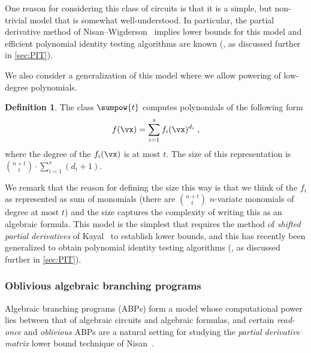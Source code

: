 \documentclass[11pt]{article}
\numberwithin{equation}{section}
\theoremstyle{definition}
\newtheorem{definition}[theorem]{Definition}
\theoremstyle{plain}
\begin{document}
One reason for considering this class of circuits is that it is a simple, but non-trivial model that is somewhat well-understood.  In particular, the partial derivative method of Nisan--Wigderson~\cite{NisanWigderson96} implies lower bounds for this model and efficient polynomial identity testing algorithms are known (\cite{Saxena08,AgrawalSS13,ForbesShpilka13a,ForbesShpilka13b,ForbesSS14}, as discussed further in \autoref{sec:PIT}).

We also consider a generalization of this model where we allow powering of low-degree polynomials.

\begin{definition}\label{def:sumpowlowdeg}
        The class $\sumpow{t}$ computes polynomials of the following form
        \[
                f(\vx)=\sum_{i=1}^{s} f_i(\vx)^{d_i}
                \;,
        \]
  where the degree of the $f_i(\vx)$ is at most $t$. The size of this representation is $\binom{n+t}{t} \cdot \sum_{i=1}^{s}(d_i+1)$.
\end{definition}

We remark that the reason for defining the size this way is that we think of the $f_i$ as represented as sum of monomials (there are $\binom{n+t}{t}$ $n$-variate monomials of degree at most $t$) and the size captures the complexity of writing this as an algebraic formula. This model is the simplest that requires the method of \emph{shifted partial derivatives} of Kayal~\cite{Kayal12,GuptaKKS14} to establish lower bounds, and this has recently been generalized to obtain polynomial identity testing algorithms (\cite{Forbes15}, as discussed further in \autoref{sec:PIT}).

%

\subsubsection{Oblivious algebraic branching programs}

Algebraic branching programs (ABPs) form a model whose computational power lies between that of algebraic circuits and algebraic formulas, and certain \emph{read-once} and \emph{oblivious} ABPs are a natural setting for studying the \emph{partial derivative matrix} lower bound technique of Nisan~\cite{Nisan91}.
\end{document}
